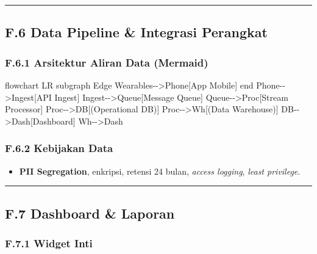 \documentclass[
  letterpaper,
  DIV=11,
  numbers=noendperiod]{scrartcl}
\newenvironment{Shaded}{\begin{snugshade}}{\end{snugshade}}
\newcommand{\NormalTok}[1]{\textcolor[rgb]{0.00,0.23,0.31}{#1}}
\providecommand{\tightlist}{%
  \setlength{\itemsep}{0pt}\setlength{\parskip}{0pt}}
\begin{document}
\begin{center}\rule{0.5\linewidth}{0.5pt}\end{center}

\subsection{F.6 Data Pipeline \& Integrasi
Perangkat}\label{f.6-data-pipeline-integrasi-perangkat}

\subsubsection{F.6.1 Arsitektur Aliran Data
(Mermaid)}\label{f.6.1-arsitektur-aliran-data-mermaid}

\begin{Shaded}
\begin{Highlighting}[]
\NormalTok{flowchart LR}
\NormalTok{  subgraph Edge}
\NormalTok{    Wearables{-}{-}\textgreater{}Phone[App Mobile]}
\NormalTok{  end}
\NormalTok{  Phone{-}{-}\textgreater{}Ingest[API Ingest]}
\NormalTok{  Ingest{-}{-}\textgreater{}Queue[Message Queue]}
\NormalTok{  Queue{-}{-}\textgreater{}Proc[Stream Processor]}
\NormalTok{  Proc{-}{-}\textgreater{}DB[(Operational DB)]}
\NormalTok{  Proc{-}{-}\textgreater{}Wh[(Data Warehouse)]}
\NormalTok{  DB{-}{-}\textgreater{}Dash[Dashboard]}
\NormalTok{  Wh{-}{-}\textgreater{}Dash}
\end{Highlighting}
\end{Shaded}

\subsubsection{F.6.2 Kebijakan Data}\label{f.6.2-kebijakan-data}

\begin{itemize}
\tightlist
\item
  \textbf{PII Segregation}, enkripsi, retensi 24 bulan, \emph{access
  logging}, \emph{least privilege}.
\end{itemize}

\begin{center}\rule{0.5\linewidth}{0.5pt}\end{center}

\subsection{F.7 Dashboard \& Laporan}\label{f.7-dashboard-laporan}

\subsubsection{F.7.1 Widget Inti}\label{f.7.1-widget-inti}
\end{document}
